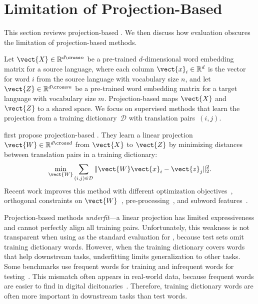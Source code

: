 \section{Limitation of Projection-Based }
\label{sec:clwe}

This section reviews projection-based .
We then discuss how  evaluation obscures the limitation of
projection-based methods.

Let $\vect{X}\in\mathbb{R}^{d\cross n}$ be a pre-trained $d$-dimensional word
embedding matrix for a source language, where each column
$\vect{x}_i\in\mathbb{R}^d$ is the vector for word $i$ from the source language
with vocabulary size $n$, and let $\vect{Z}\in\mathbb{R}^{d\cross m}$ be a
pre-trained word embedding matrix for a target language with vocabulary size $m$.
Projection-based  maps $\vect{X}$ and $\vect{Z}$ to a shared
space.
We focus on supervised methods that learn the projection from a training
dictionary~$\mathcal{D}$ with translation pairs~$(i, j)$.

\citet{mikolov-13b} first propose projection-based .
They learn a linear projection $\vect{W}\in\mathbb{R}^{d\cross d}$ from
$\vect{X}$ to $\vect{Z}$ by minimizing distances between translation pairs in
a training dictionary:
\begin{equation}
\min_{\vect{W}} \sum_{(i,j) \in \mathcal{D}} \| \vect{W} \vect{x}_i - \vect{z}_j \|_2^2.
\end{equation}
Recent work improves this method with different optimization
objectives~\citep{dinu-15,joulin-18},
orthogonal constraints on $\vect{W}$~\citep{xing-15,artetxe-16,smith-17},
pre-processing~\citep{zhang-19},
and subword features~\citep{chaudhary-18,czarnowska-19,zhang-20}.

Projection-based methods \emph{underfit}---a linear projection has limited
expressiveness and cannot perfectly align all training pairs.
Unfortunately, this weakness is not transparent when using  as the
standard evaluation for , because  test sets omit training
dictionary words.
However, when the training dictionary covers words that help downstream
tasks, underfitting limits generalization to other tasks.
Some  benchmarks use frequent words for training and infrequent words
for testing~\citep{mikolov-13b,conneau-18}.
This mismatch often appears in real-world data, because frequent
words are easier to find in digital dicitonaries~\citep{czarnowska-19}.
Therefore, training dictionary words are often more important in downstream
tasks than test words.
